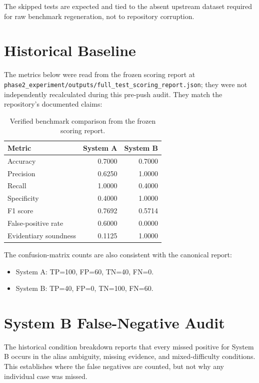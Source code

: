 \documentclass[11pt,a4paper]{article}
\begin{document}
The skipped tests are expected and tied to the absent upstream dataset required for raw benchmark regeneration, not to repository corruption.

\section{Historical Baseline}

The metrics below were read from the frozen scoring report at \texttt{phase2\_experiment/outputs/full\_test\_scoring\_report.json}; they were not independently recalculated during this pre-push audit. They match the repository's documented claims:

\begin{table}[h]
\centering
\begin{tabular}{l rr}
\toprule
Metric & System A & System B \\
\midrule
Accuracy & 0.7000 & 0.7000 \\
Precision & 0.6250 & 1.0000 \\
Recall & 1.0000 & 0.4000 \\
Specificity & 0.4000 & 1.0000 \\
F1 score & 0.7692 & 0.5714 \\
False-positive rate & 0.6000 & 0.0000 \\
Evidentiary soundness & 0.1125 & 1.0000 \\
\bottomrule
\end{tabular}
\caption{Verified benchmark comparison from the frozen scoring report.}
\end{table}

The confusion-matrix counts are also consistent with the canonical report:

\begin{itemize}[leftmargin=1.5em]
  \item System A: TP=100, FP=60, TN=40, FN=0.
  \item System B: TP=40, FP=0, TN=100, FN=60.
\end{itemize}

\section{System B False-Negative Audit}

The historical condition breakdown reports that every missed positive for System B occurs in the alias ambiguity, missing evidence, and mixed-difficulty conditions. This establishes where the false negatives are counted, but not why any individual case was missed.
\end{document}
